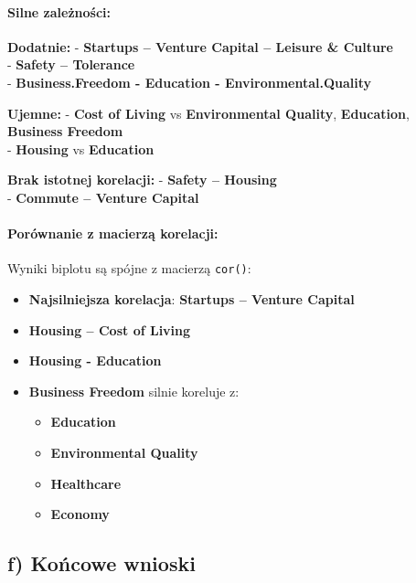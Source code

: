 \documentclass[
  12pt,
]{article}
\providecommand{\tightlist}{%
  \setlength{\itemsep}{0pt}\setlength{\parskip}{0pt}}
\begin{document}
\paragraph{\texorpdfstring{\textbf{Silne
zależności:}}{Silne zależności:}}\label{silne-zaleux17cnoux15bci}

\textbf{Dodatnie:} - \textbf{Startups -- Venture Capital -- Leisure \&
Culture}\\
- \textbf{Safety -- Tolerance}\\
- \textbf{Business.Freedom - Education - Environmental.Quality}

\textbf{Ujemne:} - \textbf{Cost of Living} vs \textbf{Environmental
Quality}, \textbf{Education}, \textbf{Business Freedom}\\
- \textbf{Housing} vs \textbf{Education}

\textbf{Brak istotnej korelacji:} - \textbf{Safety -- Housing}\\
- \textbf{Commute -- Venture Capital}

\paragraph{Porównanie z macierzą
korelacji:}\label{poruxf3wnanie-z-macierzux105-korelacji}

Wyniki biplotu są spójne z macierzą \texttt{cor()}:

\begin{itemize}
\tightlist
\item
  \textbf{Najsilniejsza korelacja}: \textbf{Startups -- Venture
  Capital}\\
\item
  \textbf{Housing -- Cost of Living}\\
\item
  \textbf{Housing - Education}
\item
  \textbf{Business Freedom} silnie koreluje z:

  \begin{itemize}
  \tightlist
  \item
    \textbf{Education}
  \item
    \textbf{Environmental Quality}
  \item
    \textbf{Healthcare}
  \item
    \textbf{Economy}
  \end{itemize}
\end{itemize}

\subsection{f) Końcowe wnioski}\label{f-koux144cowe-wnioski}
\end{document}
